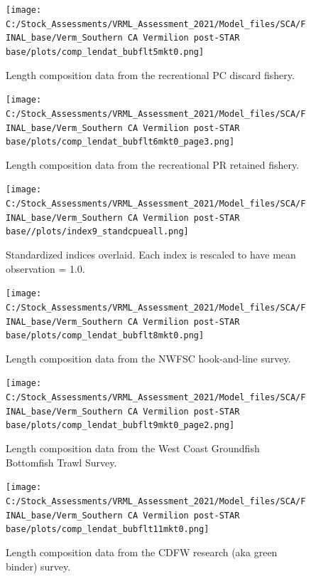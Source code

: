 \documentclass[11pt,
  english,
]{article}
\begin{document}
\begin{figure}
\centering
\texttt{[image: C:/Stock\_Assessments/VRML\_Assessment\_2021/Model\_files/SCA/FINAL\_base/Verm\_Southern CA Vermilion post-STAR base/plots/comp\_lendat\_bubflt5mkt0.png]}
\caption{Length composition data from the recreational PC discard fishery.\label{fig:len-data-REC-PC-DIS}}
\end{figure}

\begin{figure}
\centering
\texttt{[image: C:/Stock\_Assessments/VRML\_Assessment\_2021/Model\_files/SCA/FINAL\_base/Verm\_Southern CA Vermilion post-STAR base/plots/comp\_lendat\_bubflt6mkt0\_page3.png]}
\caption{Length composition data from the recreational PR retained fishery.\label{fig:len-data-REC-PR}}
\end{figure}

\begin{figure}
\centering
\texttt{[image: C:/Stock\_Assessments/VRML\_Assessment\_2021/Model\_files/SCA/FINAL\_base/Verm\_Southern CA Vermilion post-STAR base//plots/index9\_standcpueall.png]}
\caption{Standardized indices overlaid. Each index is rescaled to have mean observation = 1.0.\label{fig:cpueall}}
\end{figure}

\begin{figure}
\centering
\texttt{[image: C:/Stock\_Assessments/VRML\_Assessment\_2021/Model\_files/SCA/FINAL\_base/Verm\_Southern CA Vermilion post-STAR base/plots/comp\_lendat\_bubflt8mkt0.png]}
\caption{Length composition data from the NWFSC hook-and-line survey.\label{fig:len-data-NWFSC-HKL}}
\end{figure}

\begin{figure}
\centering
\texttt{[image: C:/Stock\_Assessments/VRML\_Assessment\_2021/Model\_files/SCA/FINAL\_base/Verm\_Southern CA Vermilion post-STAR base/plots/comp\_lendat\_bubflt9mkt0\_page2.png]}
\caption{Length composition data from the West Coast Groundfish Bottomfish Trawl Survey.\label{fig:len-data-NWFSC-TWL}}
\end{figure}

\begin{figure}
\centering
\texttt{[image: C:/Stock\_Assessments/VRML\_Assessment\_2021/Model\_files/SCA/FINAL\_base/Verm\_Southern CA Vermilion post-STAR base/plots/comp\_lendat\_bubflt11mkt0.png]}
\caption{Length composition data from the CDFW research (aka green binder) survey.\label{fig:len-data-CDFW-RESEARCH}}
\end{figure}
\end{document}
